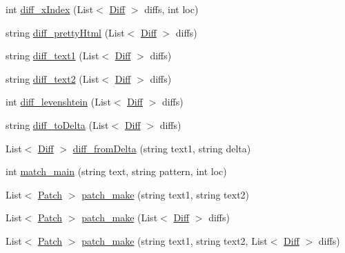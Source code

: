 \begin{DoxyCompactItemize}
int \hyperlink{class_diff_match_patch_1_1diff__match__patch_a6cbbe68de3813f101067be7ef6f039ec}{diff\+\_\+x\+Index} (List$<$ \hyperlink{class_diff_match_patch_1_1_diff}{Diff} $>$ diffs, int loc)
\item 
string \hyperlink{class_diff_match_patch_1_1diff__match__patch_a7258f7e678266156fac214868c21fb47}{diff\+\_\+pretty\+Html} (List$<$ \hyperlink{class_diff_match_patch_1_1_diff}{Diff} $>$ diffs)
\item 
string \hyperlink{class_diff_match_patch_1_1diff__match__patch_adbd27af63950b41ac99288862ee0a5b1}{diff\+\_\+text1} (List$<$ \hyperlink{class_diff_match_patch_1_1_diff}{Diff} $>$ diffs)
\item 
string \hyperlink{class_diff_match_patch_1_1diff__match__patch_a9d7cc67be08e07c1ce04602e13617b4e}{diff\+\_\+text2} (List$<$ \hyperlink{class_diff_match_patch_1_1_diff}{Diff} $>$ diffs)
\item 
int \hyperlink{class_diff_match_patch_1_1diff__match__patch_a68cef4716b006fac4cedffe9601e464e}{diff\+\_\+levenshtein} (List$<$ \hyperlink{class_diff_match_patch_1_1_diff}{Diff} $>$ diffs)
\item 
string \hyperlink{class_diff_match_patch_1_1diff__match__patch_aa5115e1ffbc4f40e7f5931ddf216a387}{diff\+\_\+to\+Delta} (List$<$ \hyperlink{class_diff_match_patch_1_1_diff}{Diff} $>$ diffs)
\item 
List$<$ \hyperlink{class_diff_match_patch_1_1_diff}{Diff} $>$ \hyperlink{class_diff_match_patch_1_1diff__match__patch_a497271f4b8a4b7c34dce408ce6e938e8}{diff\+\_\+from\+Delta} (string text1, string delta)
\item 
int \hyperlink{class_diff_match_patch_1_1diff__match__patch_a73baeacb0bd91053fdaba6d01468a871}{match\+\_\+main} (string text, string pattern, int loc)
\item 
List$<$ \hyperlink{class_diff_match_patch_1_1_patch}{Patch} $>$ \hyperlink{class_diff_match_patch_1_1diff__match__patch_aa20d000cd91c74a001c3aedfb55ad466}{patch\+\_\+make} (string text1, string text2)
\item 
List$<$ \hyperlink{class_diff_match_patch_1_1_patch}{Patch} $>$ \hyperlink{class_diff_match_patch_1_1diff__match__patch_aa877394538d8c315c39236bb693f7135}{patch\+\_\+make} (List$<$ \hyperlink{class_diff_match_patch_1_1_diff}{Diff} $>$ diffs)
\item 
List$<$ \hyperlink{class_diff_match_patch_1_1_patch}{Patch} $>$ \hyperlink{class_diff_match_patch_1_1diff__match__patch_a9e07d5734dade4e14913fb1b74ea1aab}{patch\+\_\+make} (string text1, string text2, List$<$ \hyperlink{class_diff_match_patch_1_1_diff}{Diff} $>$ diffs)

\end{DoxyCompactItemize}
